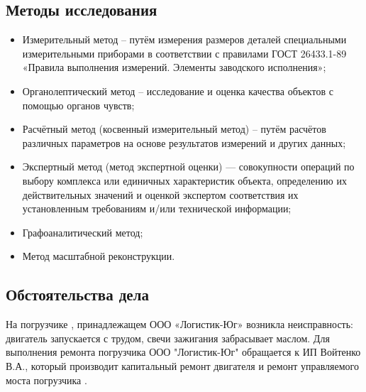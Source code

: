 \subsection{Методы исследования}

\begin{itemize}
\item 
Измерительный метод – путём измерения размеров деталей специальными измерительными приборами в соответствии с правилами ГОСТ 26433.1-89 «Правила выполнения измерений. Элементы заводского исполнения»;
\item  
Органолептический метод – исследование и оценка качества объектов с помощью органов чувств;
\item 
Расчётный метод (косвенный измерительный метод) – путём расчётов различных параметров на основе результатов измерений и других данных;
\item 
Экспертный метод (метод экспертной оценки) — совокупности операций по выбору комплекса или единичных характеристик объекта, определению их действительных значений и оценкой экспертом соответствия их установленным требованиям и/или технической информации;
\item 
Графоаналитический метод;
\item 
Метод масштабной  реконструкции.
\end{itemize}
%
%
%
%
\subsection{Обстоятельства дела}

На погрузчике , принадлежащем  ООО «Логистик-Юг» возникла неисправность: двигатель запускается с трудом,  свечи зажигания забрасывает маслом. Для выполнения ремонта погрузчика  ООО "Логистик-Юг" обращается   к ИП Войтенко В.А., который производит капитальный ремонт двигателя и ремонт управляемого моста погрузчика .

